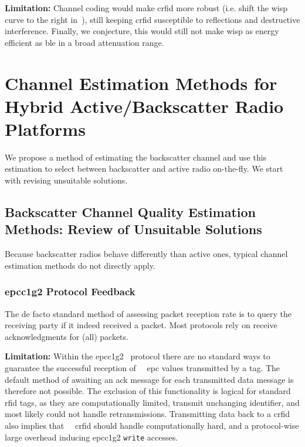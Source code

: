 \documentclass[conference,letterpaper,twoside,final,10pt]{IEEEtran}
\begin{document}
\textbf{Limitation:}
Channel coding would make \ac{crfid} more robust (i.e. shift the \ac{wisp} curve to the right in~), still keeping \ac{crfid} susceptible to reflections and destructive interference.
Finally, we conjecture, this would still not make \ac{wisp} as energy efficient as \ac{ble} in a broad attenuation range.

\section{Channel Estimation Methods for Hybrid Active/Backscatter Radio Platforms}
\label{sec:radio-switching}
\label{sec:feedback}

We propose a method of estimating the backscatter channel and use this estimation to select between backscatter and active radio on-the-fly. We start with revising unsuitable solutions.

\subsection{Backscatter Channel Quality Estimation Methods: Review of Unsuitable Solutions}

Because backscatter radios behave differently than active ones, typical channel estimation methods do not directly apply.

\subsubsection{\acs{epcc1g2} Protocol Feedback}
\label{sec:feedback/epc}

The de facto standard method of assessing packet reception rate is to query the receiving party if it indeed received a packet.
Most protocols rely on receive acknowledgments for (all) packets.

\textbf{Limitation:}
Within the \ac{epcc1g2}~\cite{epcglobal2013gen2} protocol there are no standard ways to guarantee the successful reception of {~~}\ac{epc} values transmitted by a tag.
The default method of awaiting an \ac{ack} message for each transmitted data message is therefore not possible.
The exclusion of this functionality is logical for standard \ac{rfid} tags, as they are computationally limited, transmit unchanging identifier, and most likely could not handle retransmissions.
Transmitting data back to a \ac{crfid} also implies that {~~}\ac{crfid} should handle computationally hard, and a protocol-wise large overhead inducing \ac{epcc1g2} \texttt{write} accesses.
\end{document}

